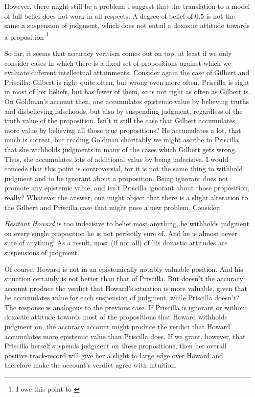 \documentclass[12pt,numbers=noenddot]{scrartcl}
\begin{document}
However, there might still be a problem:  i suggest that the translation to a model of full belief does not work in all respects: A degree of belief of 0.5 is not the same a suspension of judgment, which does not entail a doxastic attitude towards a proposition \footnote{I owe this point to \textcite{Balg2018} }

So far, it seems that accuracy veritism comes out on top, at least if we only consider cases in which there is a fixed set of propositions against which we evaluate different intellectual attainments. Consider again the case of Gilbert and Priscilla: Gilbert is right quite often, but wrong even more often. Priscilla is right in most of her beliefs, but has fewer of them, so is not right as often as Gilbert is. On Goldman's account then, one accumulates epistemic value by believing truths and disbelieving falsehoods, but also by suspending judgment, regardless of the truth value of the proposition. Isn't it still the case that Gilbert accumulates more value by believing all those true propositions? He accumulates a lot, that much is correct, but reading Goldman charitably we might ascribe to Priscilla that she withholds judgments in many of the cases which Gilbert gets wrong. Thus, she accumulates lots of additional value by being indecisive. I would concede that this point is controversial, for it is not the same thing to withhold judgment and to be ignorant about a proposition. Being ignorant does not promote any epistemic value, and isn't Priscilla ignorant about those proposition, really? Whatever the answer, one might object that there is a slight alteration to the Gilbert and Priscilla case that might pose a new problem. Consider:

\begin{description}
    \item \emph{Hesitant Howard} is too indecisive to belief most anything, he withholds judgment on every single proposition he is not perfectly sure of. And he is almost never sure of anything! As a result, most (if not all) of his doxastic attitudes are suspensions of judgment.
\end{description}

Of course, Howard is not in an epistemically notably valuable position. And his situation certainly is not better than that of Priscilla. But doesn't the accuracy account produce the verdict that Howard's situation is more valuable, given that he accumulates value for each suspension of judgment, while Priscilla doesn't? The response is analogous to the previous case. If Priscilla is ignorant or without doxastic attitude towards most of the propositions that Howard withholds judgment on, the accuracy account might produce the verdict that Howard accumulates more epistemic value than Priscilla does. If we grant, however, that Priscilla herself suspends judgment on these propositions, then her overall positive track-record will give her a slight to large edge over Howard and therefore make the account's verdict agree with intuition.
\end{document}
